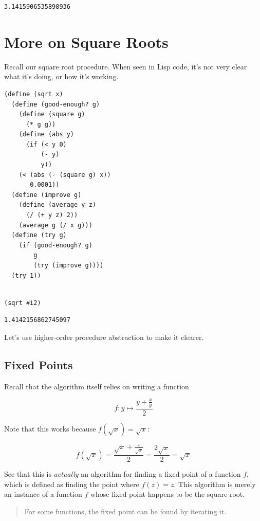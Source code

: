 \documentclass[9pt]{report}
\begin{document}
\begin{verbatim}
3.1415906535898936
\end{verbatim}

\section{More on Square Roots}
\label{sec:orgfe32ebe}

Recall our square root procedure. When seen in Lisp code, it's not
very clear what it's doing, or how it's working.

\begin{verbatim}
(define (sqrt x)
  (define (good-enough? g)
    (define (square g)
      (* g g))
    (define (abs y)
      (if (< y 0)
          (- y)
          y))
    (< (abs (- (square g) x))
       0.0001))
  (define (improve g)
    (define (average y z)
      (/ (+ y z) 2))
    (average g (/ x g)))
  (define (try g)
    (if (good-enough? g)
        g
        (try (improve g))))
  (try 1))
\end{verbatim}

\begin{verbatim}

(sqrt #i2)
\end{verbatim}

\begin{verbatim}
1.4142156862745097
\end{verbatim}


Let's use higher-order procedure abstraction to make it clearer.

\subsection{Fixed Points}
\label{sec:orgd8a3415}

Recall that the algorithm itself relies on writing a function

$$f\colon y\mapsto \frac{y+\frac{x}{y}}{2}$$

Note that this works because \(f(\sqrt{x}) = \sqrt{x}\):

$$f(\sqrt{x})=\frac{\sqrt{x}+\frac{x}{\sqrt{x}}}{2} = \frac{2\sqrt{x}}{2} = \sqrt{x}$$

See that this is \emph{actually} an algorithm for finding a fixed point
of a function \(f\), which is defined as finding the point where
\(f(z)=z\). This algorithm is merely an instance of a function \(f\)
whose fixed point happens to be the square root.

\begin{quote}
For some functions, the fixed point can be found by iterating it.
\end{quote}
\end{document}
